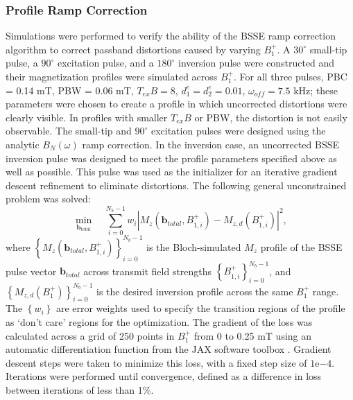 \documentclass[a4paper,12pt]{article}
\begin{document}
\subsubsection*{Profile Ramp Correction}
Simulations were performed to verify the ability of the BSSE ramp correction algorithm to correct passband distortions caused by varying $B_1^+$.
A $30^\circ$ small-tip pulse, a $90^\circ$ excitation pulse, and a $180^\circ$ inversion pulse were constructed and their magnetization profiles were simulated across $B_1^+$.
For all three pulses, PBC = 0.14 mT, PBW = 0.06 mT, $T_{ex}B = 8$, $d_1^e=d_2^e=0.01$, $\omega_{off}=7.5$ kHz; 
these parameters were chosen to create a profile in which uncorrected distortions were clearly visible.
In profiles with smaller $T_{ex}B$ or PBW, the distortion is not easily observable. 
The small-tip and $90^\circ$ excitation pulses were designed 
using the analytic $B_N(\omega)$ ramp correction.
In the inversion case, 
an uncorrected BSSE inversion pulse was designed to meet the profile parameters specified above as well as possible.
This pulse was used as the initializer for an iterative gradient descent refinement to eliminate distortions. 
The following general unconstrained problem was solved:
\begin{equation}
\min_{\bm{b}_{total}} \quad \sum_{i = 0}^{N_b - 1} w_i \left\vert M_z\left(\bm{b}_{total}, B_{1,i}^+\right) - M_{z,d}\left(B_{1,i}^+\right) \right\vert^2,
\end{equation}
where $\left\{M_z(\bm{b}_{total}, B_{1,i}^+)\right\}_{i = 0}^{N_b - 1}$ 
is the Bloch-simulated $M_z$ profile of the BSSE pulse vector $\bm{b}_{total}$ 
across transmit field strengths $\left\{B_{1,i}^+\right\}_{i=0}^{N_b-1}$, 
and $\left\{M_{z,d}(B_1^+)\right\}_{i=0}^{N_b-1}$ is the desired inversion profile across the same $B_1^+$ range. 
The $\left\{w_i\right\}$ are error weights used to specify the transition regions of the profile as `don't care' regions for the optimization.
The gradient of the loss was calculated across a grid of 250 points in $B_1^+$ from 0 to 0.25 mT using an automatic differentiation function from the JAX software toolbox \cite{Bradbury2018JAX:Programs}. 
Gradient descent steps were taken to minimize this loss, 
with a fixed step size of $1\mathrm{e}{-4}$.
Iterations were performed until convergence, defined as a difference in loss between iterations of less than 1$\%$.
\end{document}
